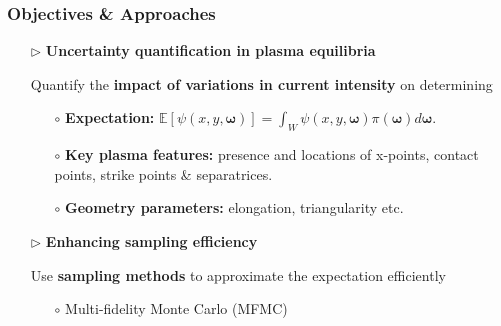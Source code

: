 \documentclass{beamer}
\begin{document}
\begin{frame}[t]
    \frametitle{Objectives \& Approaches}
        \begin{itemize}[leftmargin=5pt] 
            
            \item[$\triangleright$] \textcolor{myblue3}{\bf Uncertainty quantification in plasma equilibria} 

            \vspace{1mm}
            
            {\fontsize{10}{10}\selectfont
            Quantify the {\bf impact of variations in current intensity} on determining 
            \begin{itemize}[leftmargin=15pt]     
                \item[$\circ$]   {\bf Expectation:}
                $\mathbb{E}\left[\psi(x,y,\boldsymbol \omega)\right]=\int_W \psi(x,y,\boldsymbol{\omega})\pi(\boldsymbol\omega)d\boldsymbol{\omega}.$
            
                \vspace{0.5mm}
                \item[$\circ$] {\bf Key plasma features:}  presence and locations of x-points, contact points, strike points \& separatrices.

                \vspace{0.5mm}
                \item[$\circ$]  {\bf Geometry parameters:} elongation, triangularity etc.
                
            \end{itemize}
            }
            \vspace{2mm}
            \item[$\triangleright$] \textcolor{myblue3}{\bf Enhancing sampling efficiency}
            \vspace{1mm}
            
            {\fontsize{10}{10}\selectfont
            Use {\bf sampling methods} to approximate the expectation efficiently
            \begin{itemize}[leftmargin=15pt] 
                \item[$\circ$] \textcolor{myblue3}{Multi-fidelity Monte Carlo (MFMC)}
                

\end{itemize}}
\end{itemize}
\end{frame}
\end{document}
